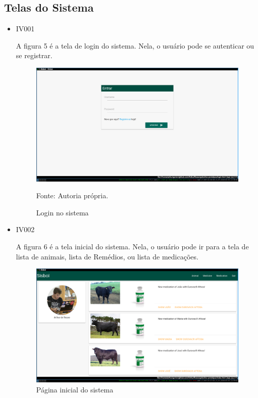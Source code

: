 \subsection{\textbf{Telas do Sistema}}

\begin{itemize}
\item IV001

A figura 5 é a tela de login do sistema. Nela, o usuário pode se autenticar ou se registrar.
\begin{figure}[H]
	\begin{center}
		\caption{Login no sistema}
		\includegraphics[width=\textwidth]{../img/prototipos/login.png}

		Fonte: Autoria própria.
	\end{center}
\end{figure}

\item IV002

A figura 6 é a tela inicial do sistema. Nela, o usuário pode ir para a tela de lista de animais, lista de Remédios, ou lista de medicações.
\begin{figure}[H]
	\begin{center}
		\caption{Página inicial do sistema}
		\includegraphics[width=\textwidth]{../img/prototipos/index.png}


\end{center}
\end{figure}
\end{itemize}
